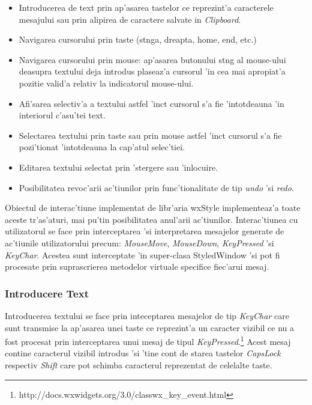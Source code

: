 \begin{itemize}
\item Introducerea de text prin ap'asarea tastelor ce reprezint'a caracterele mesajului sau prin alipirea de caractere salvate in \emph{Clipboard}.
\item Navigarea cursorului prin taste (st{\ia}nga, dreapta, home, end, etc.)
\item Navigarea cursorului prin mouse: ap'asarea butonului st{\ia}ng al mouse-ului deasupra textului deja introdus plaseaz'a cursorul 'in cea mai apropiat'a pozitie valid'a relativ la indicatorul mouse-ului.
\item Afi'sarea selectiv'a a textului astfel 'inc{\ia}t cursorul s'a fie 'intotdeauna 'in interiorul c'asu'tei text.
\item Selectarea textului prin taste sau prin mouse astfel 'inc{\ia}t cursorul s'a fie pozi'tionat 'intotdeauna la cap'atul selec'tiei.
\item Editarea textului selectat prin 'stergere sau 'inlocuire.
\item Posibilitatea revoc'arii ac'tiunilor prin func'tionalitate de tip \emph{undo} 'si \emph{redo}.
\end{itemize}

\medskip

Obiectul de interac'tiune implementat de libr'aria wxStyle implementeaz'a toate aceste tr'as'aturi, mai pu'tin posibilitatea anul'arii ac'tiunilor. Interac'tiunea cu utilizatorul se face prin interceptarea 'si interpretarea mesajelor generate de ac'tiunile utilizatorului precum: \emph{MouseMove}, \emph{MouseDown}, \emph{KeyPressed} 'si \emph{KeyChar}. Acestea sunt interceptate 'in super-clasa StyledWindow 'si pot fi procesate prin suprascrierea metodelor virtuale specifice fiec'arui mesaj.

\subsubsection{Introducere Text}

Introducerea textului se face prin inteceptarea mesajelor de tip \emph{KeyChar} care sunt transmise la ap'asarea unei taste ce reprezint'a un caracter vizibil ce nu a fost procesat prin interceptarea unui mesaj de tipul \emph{KeyPressed}.\footnote{http://docs.wxwidgets.org/3.0/classwx\_key\_event.html} Acest mesaj contine caracterul vizibil introdus 'si 'tine cont de starea tastelor \emph{CapsLock} respectiv \emph{Shift} care pot schimba caracterul reprezentat de celelalte taste.

